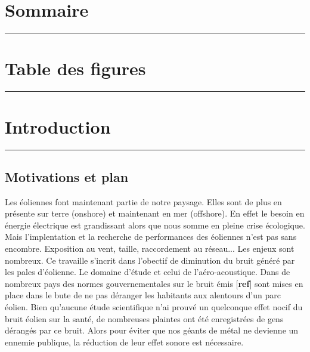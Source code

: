 \documentclass[12pt]{article}
\theoremstyle{plain}
\theoremstyle{remark}
\begin{document}
	\newpage
	
	\section*{Sommaire}
	
	\noindent\rule{\textwidth}{0.3pt}
	\vspace{0.5cm}
	

\clearpage
\section*{\Large Table des figures}
\noindent\rule{\textwidth}{0.3pt}
\vspace{0.5cm}

\listoffigures
	
\clearpage
	
	
	\section{Introduction}
	\noindent\rule{\linewidth}{2pt}
	\vspace{0.3cm}
	\subsection{Motivations et plan}
	
	Les éoliennes font maintenant partie de notre paysage. Elles sont de plus en présente sur terre (onshore) et maintenant en mer (offshore). En effet le besoin en énergie électrique est grandissant alors que nous somme en pleine crise écologique. Mais l'implentation et la recherche de performances des éoliennes n'est pas sans encombre. Exposition au vent, taille, raccordement au réseau... Les enjeux sont nombreux. Ce travaille s'incrit dans l'obectif de diminution du bruit généré par les pales d'éolienne. Le domaine d'étude et celui de l'aéro-acoustique. Dans de nombreux pays des normes gouvernementales sur le bruit émis [{\bf ref}] sont mises en place dans le bute de ne pas déranger les habitants aux alentours d'un parc éolien. Bien qu'aucune étude scientifique n'ai prouvé un quelconque effet nocif du bruit éolien sur la santé, de nombreuses plaintes ont été enregistrées de gens dérangés par ce bruit. Alors pour éviter que nos géants de métal ne devienne un ennemie publique, la réduction de leur effet sonore est nécessaire. \\
	
\end{document}

